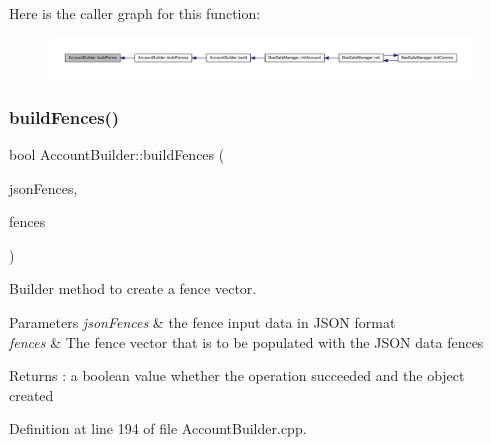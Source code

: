 Here is the caller graph for this function\+:
\nopagebreak
\begin{figure}[H]
\begin{center}
\leavevmode
\includegraphics[width=350pt]{d9/daa/class_account_builder_ac5801a1130d7a1f84a66c45cfd6e0a8d_icgraph}
\end{center}
\end{figure}
\mbox{\label{class_account_builder_a1992add0c2ab404664d4cbae326c6ec7}} 
\subsubsection{\texorpdfstring{build\+Fences()}{buildFences()}}
{\footnotesize\ttfamily bool Account\+Builder\+::build\+Fences (\begin{DoxyParamCaption}\item[{const web\+::json\+::array \&}]{json\+Fences,  }\item[{std\+::vector$<$ \hyperlink{class_fence}{Fence} $\ast$$>$ \&}]{fences }\end{DoxyParamCaption})\hspace{0.3cm}{\ttfamily [private]}}

Builder method to create a fence vector.


\begin{DoxyParams}{Parameters}
{\em json\+Fences} & the fence input data in J\+S\+ON format \\
\hline
{\em fences} & The fence vector that is to be populated with the J\+S\+ON data fences \\
\hline
\end{DoxyParams}
\begin{DoxyReturn}{Returns}
\+: a boolean value whether the operation succeeded and the object created 
\end{DoxyReturn}


Definition at line 194 of file Account\+Builder.\+cpp.


